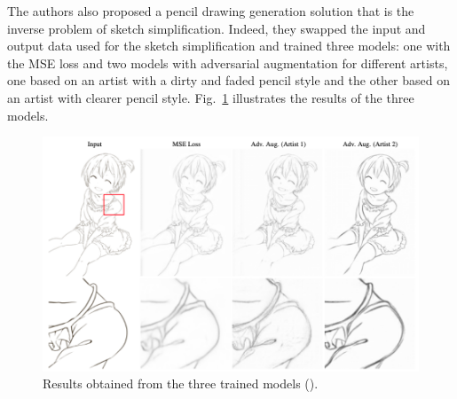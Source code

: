 \noindent The authors also proposed a pencil drawing generation solution that is the inverse problem of sketch simplification. Indeed, they swapped the input and output data used for the sketch simplification and trained three models: one with the MSE loss and two models with adversarial augmentation for different artists, one based on an artist with a dirty and faded pencil style and the other based on an artist with clearer pencil style. Fig.~\ref{fig:Mastering sketching inverse problem results} illustrates the results of the three models.
\begin{figure}[!ht]
\centering
  \includegraphics[scale=0.3]{figures/masteringSketching-inverseProblRes.png}
  \caption{Results obtained from the three trained models (\cite{masteringSketching}).}
  \label{fig:Mastering sketching inverse problem results}
\end{figure}
